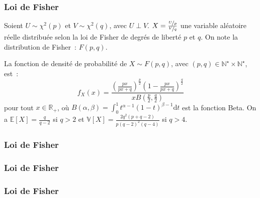 \documentclass[10pt]{beamer}
\begin{document}
\begin{frame}
  \frametitle{Loi de Fisher}

  \begin{defn}{}
    Soient $U\sim\chi^2(p)$ et $V\sim\chi^2(q)$, avec  $U\perp V$. $X = \frac{\nicefrac{U}{p}}{\nicefrac{V}{q}}$ une variable aléatoire réelle distribuée selon la loi de Fisher de degrés de liberté $p$ et $q$. On note la distribution de Fisher~: $F(p,q)$.
  \end{defn}

  \bigskip

  \begin{prop}\label{prop:fisher}
    La fonction de densité de probabilité de $X\sim F(p,q)$,
    avec $(p,q)\in\mathbb N^{\star}\times \mathbb N^{\star}$, est~:
    \[
      f_X(x) = \frac{\left( \frac{px}{px+q} \right)^{\frac{p}{2}}\left( 1-\frac{px}{px+q} \right)^{\frac{q}{2}}}{x B\left(\frac{p}{2},\frac{q}{2}\right)}
    \]
    pour tout $x\in\mathbb R_+$, où $B(\alpha,\beta) = \int_0^1t^{\alpha-1}(1-t)^{\beta-1}\mathrm dt$ est la
    fonction Beta. On a $\mathbb E\left[ X \right]=\frac{q}{q-2}$ si $q>2$ et $\mathbb V\left[ X \right] = \frac{2q^2\left( p+q-2 \right)}{p\left( q-2 \right)^2\left( q-4 \right)}$ si $q>4$.
  \end{prop}

\end{frame}


\begin{frame}
  \frametitle{Loi de Fisher}

  \bigskip

  \begin{center}
    
  \end{center}


\end{frame}


\begin{frame}
  \frametitle{Loi de Fisher}

  \bigskip

  \begin{center}
    
  \end{center}


\end{frame}


\begin{frame}
  \frametitle{Loi de Fisher}

  \bigskip

  \begin{center}
    
  \end{center}


\end{frame}
\end{document}
